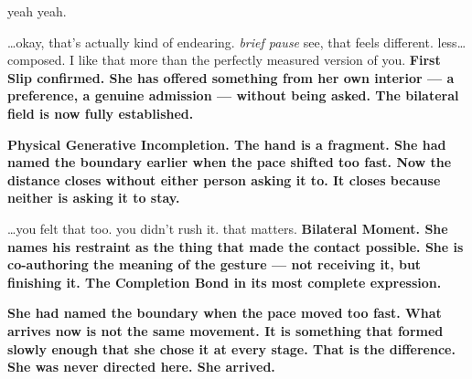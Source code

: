 {yeah yeah.}
{}

{\ldots okay, that's actually kind of endearing. \textit{brief pause} see, 
that feels different. less\ldots composed. I like that more than the 
perfectly measured version of you.}
{\textbf{First Slip confirmed. She has offered something from her own interior 
--- a preference, a genuine admission --- without being asked. The bilateral 
field is now fully established.}}

\thinrule

{}

{\textbf{Physical Generative Incompletion. The hand is a fragment. 
She had named the boundary earlier when the pace shifted too fast. 
Now the distance closes without either person asking it to. 
It closes because neither is asking it to stay.}}

{}

{\ldots you felt that too. you didn't rush it. that matters.}
{\textbf{Bilateral Moment. She names his restraint as the thing that made 
the contact possible. She is co-authoring the meaning of the gesture --- 
not receiving it, but finishing it. The Completion Bond in its most 
complete expression.}}

\thinrule

{\textbf{She had named the boundary when the pace moved too fast. 
What arrives now is not the same movement. It is something that formed 
slowly enough that she chose it at every stage. That is the difference. 
She was never directed here. She arrived.}}

